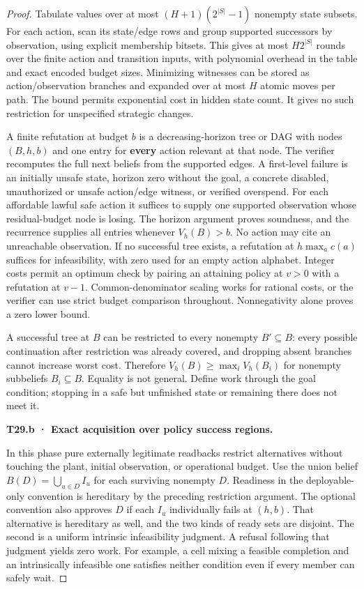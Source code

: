 \begin{proof}
Tabulate values over at most \((H+1)(2^{|S|}-1)\) nonempty state subsets. For each action, scan its state/edge rows and group supported successors by observation, using explicit membership bitsets. This gives at most \(H2^{|S|}\) rounds over the finite action and transition inputs, with polynomial overhead in the table and exact encoded budget sizes. Minimizing witnesses can be stored as action/observation branches and expanded over at most \(H\) atomic moves per path. The bound permits exponential cost in hidden state count. It gives no such restriction for unspecified strategic changes.

A finite refutation at budget \(b\) is a decreasing-horizon tree or DAG with nodes \((B,h,b)\) and one entry for \textbf{every} action relevant at that node. The verifier recomputes the full next beliefs from the supported edges. A first-level failure is an initially unsafe state, horizon zero without the goal, a concrete disabled, unauthorized or unsafe action/edge witness, or verified overspend. For each affordable lawful safe action it suffices to supply one supported observation whose residual-budget node is losing. The horizon argument proves soundness, and the recurrence supplies all entries whenever \(V_h(B)>b\). No action may cite an unreachable observation. If no successful tree exists, a refutation at \(h\max_a c(a)\) suffices for infeasibility, with zero used for an empty action alphabet. Integer costs permit an optimum check by pairing an attaining policy at \(v>0\) with a refutation at \(v-1\). Common-denominator scaling works for rational costs, or the verifier can use strict budget comparison throughout. Nonnegativity alone proves a zero lower bound.

A successful tree at \(B\) can be restricted to every nonempty \(B'\subseteq B\): every possible continuation after restriction was already covered, and dropping absent branches cannot increase worst cost. Therefore \(V_h(B)\ge\max_i V_h(B_i)\) for nonempty subbeliefs \(B_i\subseteq B\). Equality is not general. Define work through the goal condition; stopping in a safe but unfinished state or remaining there does not meet it.

\textbf{T29.b · Exact acquisition over policy success regions.}

In this phase pure externally legitimate readbacks restrict alternatives without touching the plant, initial observation, or operational budget. Use the union belief \(B(D)=\bigcup_{u\in D}I_u\) for each surviving nonempty \(D\). Readiness in the deployable-only convention is hereditary by the preceding restriction argument. The optional convention also approves \(D\) if each \(I_u\) individually fails at \((h,b)\). That alternative is hereditary as well, and the two kinds of ready sets are disjoint. The second is a uniform intrinsic infeasibility judgment. A refusal following that judgment yields zero work. For example, a cell mixing a feasible completion and an intrinsically infeasible one satisfies neither condition even if every member can safely wait.


\end{proof}
